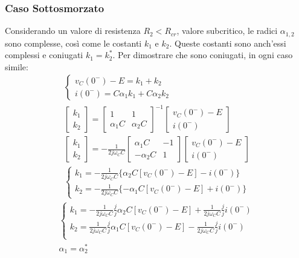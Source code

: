 \documentclass{article}
\numberwithin{equation}{subsection}
\begin{document}
\subsubsection{Caso Sottosmorzato}
Considerando un valore di resistenza $R_2<R_{cr}$, valore subcritico, le radici $\alpha_{1,2}$ sono complesse, così come le costanti $k_1$ e $k_2$. Queste costanti sono anch'essi 
complessi e coniugati $k_1=k_2^*$. Per dimostrare che sono coniugati, in ogni caso simile:
\begin{gather*}
    \begin{cases}
        v_C(0^-)-E=k_1+k_2\\
        i(0^-)=C\alpha_1k_1+C\alpha_2k_2
    \end{cases}\\
    \begin{bmatrix}
        k_1\\k_2
    \end{bmatrix}=
    \begin{bmatrix}
        1&1\\\alpha_1C&\alpha_2C 
    \end{bmatrix}^{-1}
    \begin{bmatrix}
        v_C(0^-)-E\\i(0^-)
    \end{bmatrix}\\
    \begin{bmatrix}
        k_1\\k_2
    \end{bmatrix}=\displaystyle-\frac{1}{2j\omega_CC}
    \begin{bmatrix}
        \alpha_1C&-1\\-\alpha_2C&1
    \end{bmatrix}
    \begin{bmatrix}
        v_C(0^-)-E\\i(0^-)
    \end{bmatrix}\\
    \begin{cases}
        k_1=\displaystyle-\frac{1}{2j\omega_C C}\{\alpha_2C[v_C(0^-)-E]-i(0^-)\}\\
        k_2=\displaystyle-\frac{1}{2j\omega_C C}\{-\alpha_1C[v_C(0^-)-E]+i(0^-)\}
    \end{cases}
\end{gather*}
\begin{gather*}
    \begin{cases}
        k_1=\displaystyle-\frac{1}{2j\omega_CC}\frac{j}{j}\alpha_2C[v_C(0^-)-E]+\frac{1}{2j\omega_CC}\frac{j}{j}i(0^-)\\
        k_2=\displaystyle\frac{1}{2j\omega_CC}\frac{j}{j}\alpha_1C[v_C(0^-)-E]-\frac{1}{2j\omega_CC}\frac{j}{j}i(0^-)\\
    \end{cases}\\
    \alpha_1=\alpha_2^*
\end{gather*}
\end{document}
